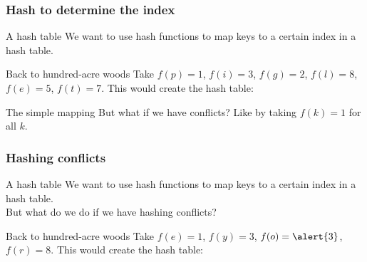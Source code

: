 \begin{frame}
	\frametitle{Hash to determine the index}

	\begin{problemblock}{A hash table}
		We want to use hash functions to map keys to a certain index in a hash table.
	\end{problemblock}
	\pause
	\begin{exampleblock}{Back to hundred-acre woods}
		Take $f(p) = 1$, $f(i) = 3$, $f(g) = 2$, $f(l) = 8$, $f(e) = 5$, $f(t) = 7$.
		\pause
		This would create the hash table:
		\begin{center}
			
		\end{center}
	\end{exampleblock}	
	\pause
	\begin{alertblock}{The simple mapping}
		But what if we have conflicts? Like by taking $f(k)=1$ for all $k$.
	\end{alertblock}	
\end{frame}

\begin{frame}
	\frametitle{Hashing conflicts}
	\begin{problemblock}{A hash table}
		We want to use hash functions to map keys to a certain index in a hash table.\\
		But what do we do if we have hashing conflicts?
	\end{problemblock}
	\pause
	\begin{exampleblock}{Back to hundred-acre woods}
		Take $f(e) = 1$, $f(y) = 3$, $f(o) = \alert{3}$, $f(r) = 8$.
		\pause
		This would create the hash table:
		\begin{center}
			
		\end{center}
	\end{exampleblock}	
\end{frame}

